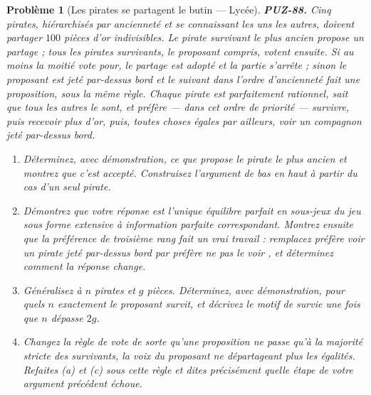 \documentclass[11pt]{article}
\newtheorem{problem}{Problème}
\begin{document}
\begin{problem}[{Les pirates se partagent le butin --- Lycée}]
\textbf{PUZ-88.} Cinq pirates, hiérarchisés par ancienneté et se connaissant les uns les
autres, doivent partager $ 100 $ pièces d'or indivisibles. Le pirate survivant le plus
ancien propose un partage ; tous les pirates survivants, le proposant compris, votent
ensuite. Si au moins la moitié vote pour, le partage est adopté et la partie s'arrête ; sinon
le proposant est jeté par-dessus bord et le suivant dans l'ordre d'ancienneté fait une
proposition, sous la même règle. Chaque pirate est parfaitement rationnel, sait que tous les
autres le sont, et préfère --- dans cet ordre de priorité --- survivre, puis recevoir plus d'or,
puis, toutes choses égales par ailleurs, voir un compagnon jeté par-dessus bord.
\begin{enumerate}
\item[(a)] Déterminez, avec démonstration, ce que propose le pirate le plus ancien et montrez que
c'est accepté. Construisez l'argument de bas en haut à partir du cas d'un seul pirate.
\item[(b)] Démontrez que votre réponse est l'unique équilibre parfait en sous-jeux du jeu sous forme
extensive à information parfaite correspondant. Montrez ensuite que la préférence de
troisième rang fait un vrai travail : remplacez \og{} préfère voir un pirate jeté par-dessus
bord \fg{} par \og{} préfère ne pas le voir \fg{}, et déterminez comment la réponse change.
\item[(c)] Généralisez à $ n $ pirates et $ g $ pièces. Déterminez, avec démonstration, pour
quels $ n $ exactement le proposant survit, et décrivez le motif de survie une fois que
$ n $ dépasse $ 2g $.
\item[(d)] Changez la règle de vote de sorte qu'une proposition ne passe qu'à la majorité stricte
des survivants, la voix du proposant ne départageant plus les égalités. Refaites (a) et (c)
sous cette règle et dites précisément quelle étape de votre argument précédent échoue.
\end{enumerate}

\end{problem}
\end{document}
